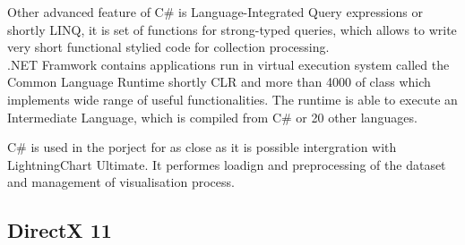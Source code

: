 \documentclass[twoside, english, 11pt]{report}
\begin{document}
Other advanced feature of C\# is Language-Integrated Query expressions or shortly LINQ, it is set of functions for strong-typed queries, which allows to write very short functional stylied code for collection processing.\\

.NET Framwork contains applications run in virtual execution system called the Common Language Runtime shortly CLR and more than 4000 of class which implements wide range of useful functionalities. The runtime is able to execute an Intermediate Language, which is compiled from C\# or 20 other languages.

C\# is used in the porject for as close as it is possible intergration with LightningChart Ultimate. It performes loadign and preprocessing of the dataset and management of visualisation process.

\subsection{DirectX 11}
\end{document}
